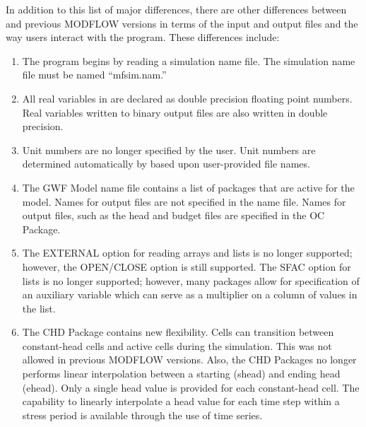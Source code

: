 In addition to this list of major differences, there are other differences between \mf and previous MODFLOW versions in terms of the input and output files and the way users interact with the program.  These differences include:

\begin{enumerate}

\item The \mf program begins by reading a simulation name file.  The simulation name file must be named ``mfsim.nam.''

\item All real variables in \mf are declared as double precision floating point numbers.  Real variables written to binary output files are also written in double precision.

\item Unit numbers are no longer specified by the user.  Unit numbers are determined automatically by \mf based upon user-provided file names.

\item The GWF Model name file contains a list of packages that are active for the model.  Names for output files are not specified in the name file.  Names for output files, such as the head and budget files are specified in the OC Package.

\item The EXTERNAL option for reading arrays and lists is no longer supported; however, the OPEN/CLOSE option is still supported.  The SFAC option for lists is no longer supported; however, many packages allow for specification of an auxiliary variable which can serve as a multiplier on a column of values in the list.

\item The CHD Package contains new flexibility.  Cells can transition between constant-head cells and active cells during the simulation.  This was not allowed in previous MODFLOW versions.  Also, the CHD Packages no longer performs linear interpolation between a starting (shead) and ending head (ehead).  Only a single head value is provided for each constant-head cell.  The capability to linearly interpolate a head value for each time step within a stress period is available through the use of time series.


\end{enumerate}
